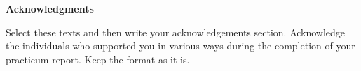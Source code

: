 %

\clearpage
{}
{}

\begin{center}
  {\fontsize{14pt}{18pt}\selectfont\bfseries Acknowledgments\par}
  \vspace{18pt}
\end{center}

Select these texts and then write your acknowledgements section. Acknowledge the individuals who supported you in various ways during the completion of your practicum report. Keep the format as it is.
